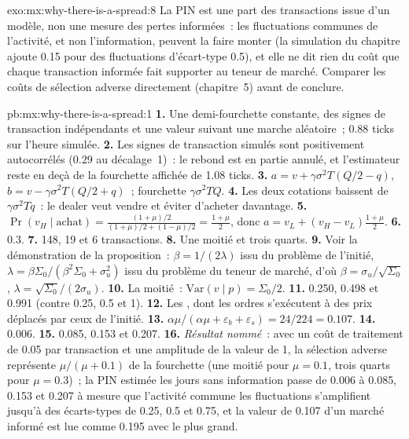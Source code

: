 \begin{solution}{exo:mx:why-there-is-a-spread:8}
La PIN est une part des transactions issue d'un modèle, non une mesure des pertes informées~: les fluctuations communes de l'activité, et non l'information, peuvent la faire monter (la simulation du chapitre
ajoute 0.15 pour des fluctuations d'écart-type 0.5), et elle ne dit rien du coût que chaque transaction informée fait supporter au teneur de marché. Comparer les coûts de sélection adverse
directement (chapitre~5) avant de conclure.
\end{solution}

\begin{solution}{pb:mx:why-there-is-a-spread:1}
\textbf{1.} Une demi-fourchette constante, des signes de transaction indépendants et une valeur suivant une marche aléatoire~; 0.88 ticks sur l'heure simulée.
\textbf{2.} Les signes de transaction simulés sont positivement autocorrélés (0.29 au décalage~1)~: le rebond est en partie annulé, et l'estimateur reste en deçà
de la fourchette affichée de 1.08 ticks.
\textbf{3.} $a=v+\gamma\sigma^2T(Q/2-q)$, $b=v-\gamma\sigma^2T(Q/2+q)$~; fourchette $\gamma\sigma^2TQ$.
\textbf{4.} Les deux cotations baissent de $\gamma\sigma^2Tq$~: le dealer veut vendre et éviter d'acheter davantage.
\textbf{5.} $\Pr(v_H\mid\text{achat})=\tfrac{(1+\mu)/2}{(1+\mu)/2+(1-\mu)/2}=\tfrac{1+\mu}{2}$, donc $a=v_L+(v_H-v_L)\tfrac{1+\mu}{2}$.
\textbf{6.} 0.3.
\textbf{7.} 148, 19 et 6 transactions.
\textbf{8.} Une moitié et trois quarts.
\textbf{9.} Voir la démonstration de la proposition~: $\beta=1/(2\lambda)$ issu du problème de l'initié, $\lambda=\beta\Sigma_0/(\beta^2\Sigma_0+\sigma_u^2)$ issu du
problème du teneur de marché, d'où $\beta=\sigma_u/\sqrt{\Sigma_0}$, $\lambda=\sqrt{\Sigma_0}/(2\sigma_u)$.
\textbf{10.} La moitié~: $\mathrm{Var}(v\mid p)=\Sigma_0/2$.
\textbf{11.} 0.250, 0.498 et 0.991 (contre 0.25, 0.5 et 1).
\textbf{12.} Les , dont les ordres s'exécutent à des prix déplacés par ceux de l'initié.
\textbf{13.} $\alpha\mu/(\alpha\mu+\varepsilon_b+\varepsilon_s)=24/224=0.107$.
\textbf{14.} 0.006.
\textbf{15.} 0.085, 0.153 et 0.207.
\textbf{16.} \emph{Résultat nommé}~: avec un coût de traitement de 0.05 par transaction et une amplitude de la valeur de 1, la sélection adverse représente $\mu/(\mu+0.1)$ de la fourchette
(une moitié pour $\mu=0.1$, trois quarts pour $\mu=0.3$)~; la PIN estimée les jours sans information passe de 0.006 à 0.085, 0.153 et 0.207 à mesure que l'activité commune
les fluctuations s'amplifient jusqu'à des écarts-types de 0.25, 0.5 et 0.75, et la valeur de 0.107 d'un marché informé est lue comme 0.195 avec le plus grand.

\end{solution}
